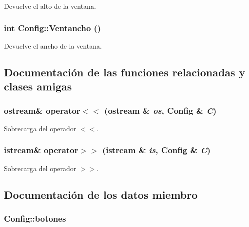 Devuelve el alto de la ventana. 

\hypertarget{class_config_80c099b02be9635d3245daf2e05bb6e6}{
\subsubsection[{Ventancho}]{\setlength{\rightskip}{0pt plus 5cm}int Config::Ventancho ()}}
\label{class_config_80c099b02be9635d3245daf2e05bb6e6}


Devuelve el ancho de la ventana. 



\subsection{Documentación de las funciones relacionadas y clases amigas}
\hypertarget{class_config_281dd477583c5361ca8fbdd58a80ca72}{
\subsubsection[{operator$<$$<$}]{\setlength{\rightskip}{0pt plus 5cm}ostream\& operator$<$$<$ (ostream \& {\em os}, \/  {\bf Config} \& {\em C})}}
\label{class_config_281dd477583c5361ca8fbdd58a80ca72}


Sobrecarga del operador $<$$<$. 

\hypertarget{class_config_d9d17872a79524063d3afa93725719e3}{
\subsubsection[{operator$>$$>$}]{\setlength{\rightskip}{0pt plus 5cm}istream\& operator$>$$>$ (istream \& {\em is}, \/  {\bf Config} \& {\em C})}}
\label{class_config_d9d17872a79524063d3afa93725719e3}


Sobrecarga del operador $>$$>$. 



\subsection{Documentación de los datos miembro}
\hypertarget{class_config_47db6265e31072da47a2062fda7971e1}{
\subsubsection[{botones}]{ {\bf Config::botones}}}
\label{class_config_47db6265e31072da47a2062fda7971e1}


